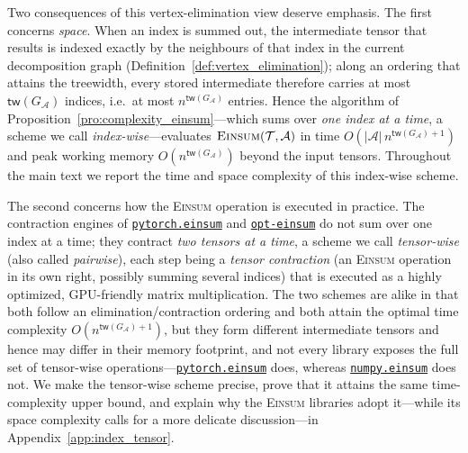 \documentclass[sn-mathphys, natbib=false]{sn-jnl}
\newcommand{\libref}[2]{\href{#2}{\texttt{#1}}}
\theoremstyle{plain}
\theoremstyle{definition}
\def\Einsum{\textsc{Einsum}}
\newcommand{\tensorcontraction}{\textsc{Einsum}}
\newcommand{\treewidthp}[1]{\mathsf{tw}(#1)}
\newcommand{\less}{O}
\newif\ifshowchanges
\newcommand{\rev}[1]{%
  \ifshowchanges
    {\color{red} #1}%
  \else
    #1%
  \fi
}
\newcommand{\numpyeinsum}{\libref{numpy.einsum}{https://numpy.org/doc/2.1/reference/generated/numpy.einsum.html}}
\newcommand{\torcheinsum}{\libref{pytorch.einsum}{https://pytorch.org/docs/stable/generated/torch.einsum.html}}
\newcommand{\opteinsum}{\libref{opt-einsum}{https://dgasmith.github.io/opt_einsum/}}
\def\calA{\mathcal{A}}
\def\calT{\mathcal{T}}
\begin{document}
\begin{bibunit}[agsm]
\rev{Two consequences of this vertex-elimination view deserve emphasis. The first concerns \emph{space}. When an index is summed out, the intermediate tensor that results is indexed exactly by the neighbours of that index in the current decomposition graph (Definition~\ref{def:vertex_elimination}); along an ordering that attains the treewidth, every stored intermediate therefore carries at most $\treewidthp{G_\calA}$ indices, i.e.\ at most $n^{\treewidthp{G_\calA}}$ entries. Hence the algorithm of Proposition~\ref{pro:complexity_einsum}---which sums over \emph{one index at a time}, a scheme we call \emph{index-wise}---evaluates $\tensorcontraction(\calT, \calA)$ in time $\less(|\calA|\, n^{\treewidthp{G_\calA}+1})$ and peak working memory $\less(n^{\treewidthp{G_\calA}})$ beyond the input tensors. Throughout the main text we report the time and space complexity of this index-wise scheme.}

\rev{The second concerns how the \Einsum{} operation is executed in practice. The contraction engines of \torcheinsum{} and \opteinsum{} do not sum over one index at a time; they contract \emph{two tensors at a time}, a scheme we call \emph{tensor-wise} (also called \emph{pairwise}), each step being a \emph{tensor contraction} (an \Einsum{} operation in its own right, possibly summing several indices) that is executed as a highly optimized, GPU-friendly matrix multiplication. The two schemes are alike in that both follow an elimination/contraction ordering and both attain the optimal time complexity $\less(n^{\treewidthp{G_\calA}+1})$, but they form different intermediate tensors and hence may differ in their memory footprint, and not every library exposes the full set of tensor-wise operations---\torcheinsum{} does, whereas \numpyeinsum{} does not. We make the tensor-wise scheme precise, prove that it attains the same time-complexity upper bound, and explain why the \Einsum{} libraries adopt it---while its space complexity calls for a more delicate discussion---in Appendix~\ref{app:index_tensor}.}


\end{bibunit}
\end{document}
